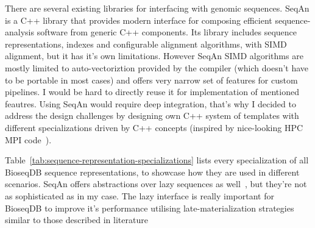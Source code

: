 There are several existing libraries for interfacing with genomic sequences.
SeqAn\autocite{REINERT2017157,seqanManual} is a C++ library that provides modern interface for composing efficient sequence-analysis
software from generic C++ components. Its library includes sequence
representations, indexes and configurable alignment algorithms, with SIMD
alignment, but it has it's own limitations. However SeqAn SIMD algorithms are mostly limited to auto-vectoriztion provided by the compiler (which doesn't have to be portable in most cases) and offers very narrow set of features for custom pipelines.
I would be hard to directly reuse it for implementation of mentioned feautres. Using SeqAn would require deep integration, that's why I decided to address the design challenges by designing 
own C++ system of templates with different specializations driven by C++ concepts (inspired by nice-looking HPC MPI code~\cite{uhl2026conceptspracticecmpi}).


Table~\ref{tab:sequence-representation-specializations} lists every specialization of all BioseqDB sequence representations, to showcase how they are used in different scenarios. SeqAn offers abstractions over lazy sequences as well~\cite{seqanSequencesInDepth}, but they're not as sophisticated as in my case.
The lazy interface is really important for BioseqDB to improve it's performance utilising late-materialization strategies similar to those described in literature~\autocite{Chernishev2022ACS}

